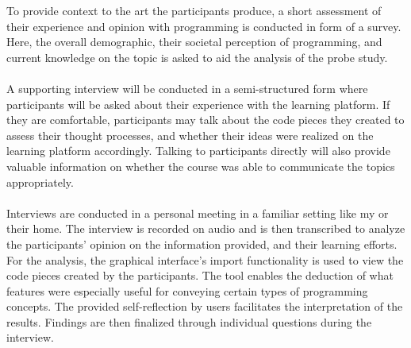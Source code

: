 To provide context to the art the participants produce, a short assessment of their experience and opinion with programming is conducted in form of a survey. Here, the overall demographic, their societal perception of programming, and current knowledge on the topic is asked to aid the analysis of the probe study. \\ \\ 
A supporting interview will be conducted in a semi-structured form where participants will be asked about their experience with the learning platform. If they are comfortable, participants may talk about the code pieces they created to assess their thought processes, and whether their ideas were realized on the learning platform accordingly. Talking to participants directly will also provide valuable information on whether the course was able to communicate the topics appropriately. \\ \\
Interviews are conducted in a personal meeting in a familiar setting like my or their home. The interview is recorded on audio and is then transcribed to analyze the participants’ opinion on the information provided, and their learning efforts.
For the analysis, the graphical interface’s import functionality is used to view the code pieces created by the participants. The tool enables the deduction of what features were especially useful for conveying certain types of programming concepts. The provided self-reflection by users facilitates the interpretation of the results. Findings are then finalized through individual questions during the interview.